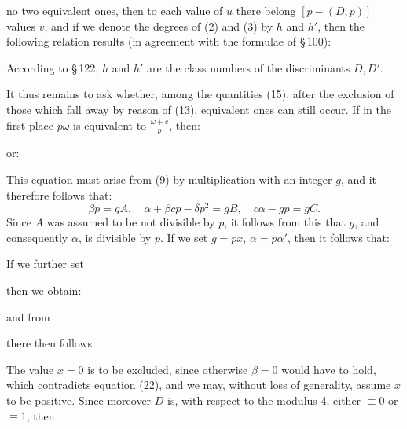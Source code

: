 no two equivalent ones, then to each value of $u$ there belong $[p-(D,p)]$ values $v$, and if we denote the degrees of (2) and (3) by $h$ and $h'$, then the following relation results (in agreement with the formulae of \S\,100):


According to \S\,122, $h$ and $h'$ are the class numbers of the discriminants $D, D'$.

It thus remains to ask whether, among the quantities (15), after the exclusion of those which fall away by reason of (13), equivalent ones can still occur. If in the first place $p\omega$ is equivalent to $\frac{\omega+c}{p}$, then:


or:


This equation must arise from (9) by multiplication with an integer $g$, and it therefore follows that:
\[
\beta p = gA, \quad \alpha+\beta c p-\delta p^2 = gB, \quad c\alpha - gp = gC. %
\]
Since $A$ was assumed to be not divisible by $p$, it follows from this that $g$, and consequently $\alpha$, is divisible by $p$. If we set $g=px$, $\alpha=p\alpha'$, then it follows that:


If we further set


then we obtain:


and from


there then follows


The value $x=0$ is to be excluded, since otherwise $\beta=0$ would have to hold, which contradicts equation (22), and we may, without loss of generality, assume $x$ to be positive. Since moreover $D$ is, with respect to the modulus 4, either $\equiv 0$ or $\equiv 1$, then
